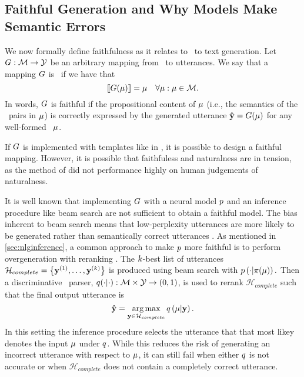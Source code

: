 \subsection{Faithful Generation and Why Models Make Semantic Errors}

We now formally define faithfulness as it relates to \meaningrepresentation~to
text generation.
Let $G : \mathcal{M} \rightarrow \mathcal{Y}$ be an arbitrary mapping from 
\meaningrepresentations~to utterances. We say that a mapping $G$ is 
\faithful~if we have that \[\left\llbracket G(\mu) \right\rrbracket = \mu \quad \forall \mu: \mu \in \mathcal{M}.\] In words,
$G$ is faithful if the propositional content of $\mu$ (i.e., the semantics
of the \attributevalue~pairs in $\mu$) is correctly expressed by the 
generated utterance $\boldsymbol{\hat{\mathbf{y}}} = G(\mu)$ for any well-formed \meaningrepresentation~$\mu$. 

If $G$ is implemented with templates like in \cite{puzikov2018},
it is possible to design a faithful mapping. However, it is possible that 
faithfuless and naturalness are in tension, as the method of \cite{puzikov2018}
did not performance highly on human judgements of naturalness.

It is well known that implementing $G$ with a neural model $p$ and 
an inference procedure like beam search are not sufficient to obtain a faithful
model.  The bias inherent to beam search means that 
low-perplexity utterances are 
more likely to be generated rather than semantically correct utterances \citep{serban2016}. 
 As mentioned in \autoref{sec:nlginference},  a common approach to make $p$ more faithful is to perform overgeneration 
 with
reranking \citep{dusek2016,juraska2018,dusek2019,dusek2020}. 
The $k$-best list of utterances $\mathcal{H}_{complete} = \left\{\mathbf{y}^{(1)},\ldots,
\mathbf{y}^{(k)}\right\}$ is produced using beam search with $p\left(\cdot|\pi(\mu)\right).$
Then 
a discriminative \meaningrepresentation~parser, $q(\cdot|\cdot) : \mathcal{M} \times \mathcal{Y} \rightarrow (0,1)$, is used to rerank $\mathcal{H}_{complete}$ such
that the final output utterance is \[
\boldsymbol{\hat{\mathbf{y}}} = \operatorname*{arg\,max}_{\mathbf{y} \in \mathcal{H}_{complete}} q\left(\mu\vert\mathbf{y}\right). \]
In this setting the inference procedure selects the 
utterance that 
that most likey denotes the input $\mu$ under $q$. While this reduces the risk of
generating an incorrect utterance with respect to $\mu$, it can still fail
when either $q$ is not accurate or when $\mathcal{H}_{complete}$ does not contain
a completely correct utterance.

